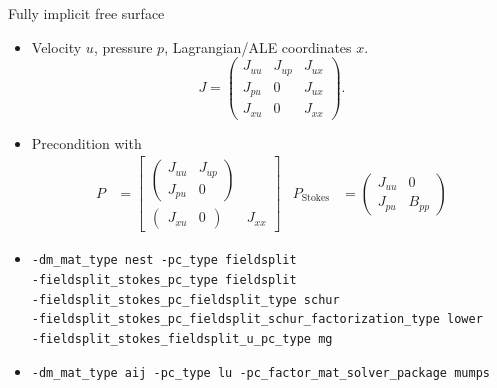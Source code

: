 \begin{frame}[fragile]{Fully implicit free surface}
  \begin{itemize}
  \item Velocity $u$, pressure $p$, Lagrangian/ALE coordinates $x$.
    \begin{equation*}
      J =
      \begin{pmatrix}
        J_{uu} & J_{up} & J_{ux} \\
        J_{pu} & 0 & J_{ux} \\
        J_{xu} & 0 & J_{xx}
      \end{pmatrix} .
    \end{equation*}
  \item Precondition with
    \begin{align*}
      P &=
      \begin{bmatrix}
        \begin{pmatrix}
          J_{uu} & J_{up} \\
          J_{pu} & 0
        \end{pmatrix} & \\
        \begin{pmatrix}
          J_{xu} & 0
        \end{pmatrix}
        & J_{xx}
      \end{bmatrix} &
      P_{\text{Stokes}} &=
      \begin{pmatrix}
        J_{uu} & 0 \\
        J_{pu} & B_{pp}
      \end{pmatrix}
    \end{align*}
  \item {\scriptsize
\begin{verbatim}
-dm_mat_type nest -pc_type fieldsplit
-fieldsplit_stokes_pc_type fieldsplit
-fieldsplit_stokes_pc_fieldsplit_type schur
-fieldsplit_stokes_pc_fieldsplit_schur_factorization_type lower
-fieldsplit_stokes_fieldsplit_u_pc_type mg
\end{verbatim}
}
\item {\scriptsize
\begin{verbatim}
-dm_mat_type aij -pc_type lu -pc_factor_mat_solver_package mumps
\end{verbatim}
}
  \end{itemize}
\end{frame}
